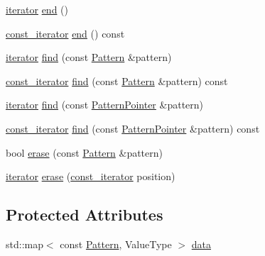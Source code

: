 \begin{DoxyCompactItemize}
\hyperlink{classHashOrderedPatternMap_a149481ae49379713dae0ffcaff294f65}{iterator} \hyperlink{classHashOrderedPatternMap_aa2a8090eed690299d4abeb36ea16fb3d}{end} ()
\item 
\hyperlink{classHashOrderedPatternMap_a0162fc35654440e11ea66e71e8ffe8f8}{const\+\_\+iterator} \hyperlink{classHashOrderedPatternMap_a0aa676a59fa89d30a0c477c193d7ceec}{end} () const 
\item 
\hyperlink{classHashOrderedPatternMap_a149481ae49379713dae0ffcaff294f65}{iterator} \hyperlink{classHashOrderedPatternMap_ab0391b67630d9c20ee0069f7197ca9da}{find} (const \hyperlink{classPattern}{Pattern} \&pattern)
\item 
\hyperlink{classHashOrderedPatternMap_a0162fc35654440e11ea66e71e8ffe8f8}{const\+\_\+iterator} \hyperlink{classHashOrderedPatternMap_aa3894103fb86543ab242d0da072afb56}{find} (const \hyperlink{classPattern}{Pattern} \&pattern) const 
\item 
\hyperlink{classHashOrderedPatternMap_a149481ae49379713dae0ffcaff294f65}{iterator} \hyperlink{classHashOrderedPatternMap_a1b1f8f29f6a967b945a7d22907890977}{find} (const \hyperlink{classPatternPointer}{Pattern\+Pointer} \&pattern)
\item 
\hyperlink{classHashOrderedPatternMap_a0162fc35654440e11ea66e71e8ffe8f8}{const\+\_\+iterator} \hyperlink{classHashOrderedPatternMap_a3e53d13c20a970bb1009494ea8c7c3ba}{find} (const \hyperlink{classPatternPointer}{Pattern\+Pointer} \&pattern) const 
\item 
bool \hyperlink{classHashOrderedPatternMap_acc3231c8b727c982ef11c80d3390f8ec}{erase} (const \hyperlink{classPattern}{Pattern} \&pattern)
\item 
\hyperlink{classHashOrderedPatternMap_a149481ae49379713dae0ffcaff294f65}{iterator} \hyperlink{classHashOrderedPatternMap_a3c9a41c27310278a2d2f02cc7016ebae}{erase} (\hyperlink{classHashOrderedPatternMap_a0162fc35654440e11ea66e71e8ffe8f8}{const\+\_\+iterator} position)
\end{DoxyCompactItemize}
\subsection*{Protected Attributes}
\begin{DoxyCompactItemize}
\item 
std\+::map$<$ const \hyperlink{classPattern}{Pattern}, Value\+Type $>$ \hyperlink{classHashOrderedPatternMap_adb4b3e32e897537d7bb1f5deaa650b7a}{data}
\end{DoxyCompactItemize}


